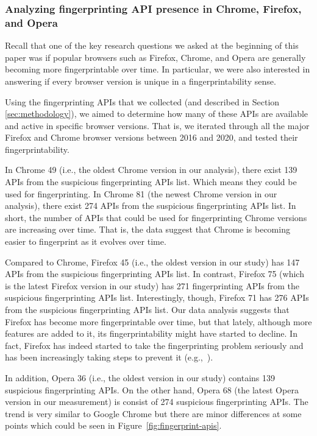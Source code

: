 \subsubsection{Analyzing fingerprinting API presence in Chrome, Firefox, and Opera}

Recall that one of the key research questions we asked at the beginning of
this paper was if popular browsers such as Firefox, Chrome, and Opera are
generally becoming more fingerprintable over time. In particular, we
were also interested in answering if every browser version is unique
in a fingerprintability sense.

Using the fingerprinting APIs that we collected (and described in
Section \ref{sec:methodology}), we aimed to determine how many of
these APIs are available and active in specific browser versions. That
is, we iterated through all the major Firefox and Chrome browser
versions between 2016 and 2020, and tested their fingerprintability.

In Chrome 49 (i.e., the oldest Chrome version in our analysis),
there exist 139 APIs from the suspicious fingerprinting APIs list. Which
means they could be used for fingerprinting. In Chrome
81 (the newest Chrome version in our analysis), there
exist 274 APIs from the suspicious fingerprinting APIs list. In short, the
number of APIs that could be used for fingerprinting Chrome versions
are increasing over time. That is, the data suggest that Chrome is
becoming easier to fingerprint as it evolves over time.

Compared to Chrome, Firefox 45 (i.e., the oldest version in our study)
has 147 APIs from the suspicious fingerprinting APIs list. In contrast,
Firefox 75 (which is the latest Firefox version in our study) has 271
fingerprinting APIs from the suspicious fingerprinting APIs list.
Interestingly, though, Firefox 71 has 276 APIs from the suspicious
fingerprinting APIs list. Our data analysis suggests that
Firefox has become more fingerprintable over time, but that lately,
although more features are added to it, its fingerprintability might
have started to decline. In fact, Firefox has indeed started to take
the fingerprinting problem seriously and has been increasingly taking
steps to prevent it (e.g.,~\cite{FirefoxFingerprinting}).

In addition, Opera 36 (i.e., the oldest version in our study) contains 139
suspicious fingerprinting APIs. On the other hand, Opera 68 (the latest Opera version in our measurement)
is consist of 274 suspicious fingerprinting APIs. The trend is very similar to Google Chrome but there are minor
differences at some points which could be seen in Figure~\ref{fig:fingerprint-apis}.

